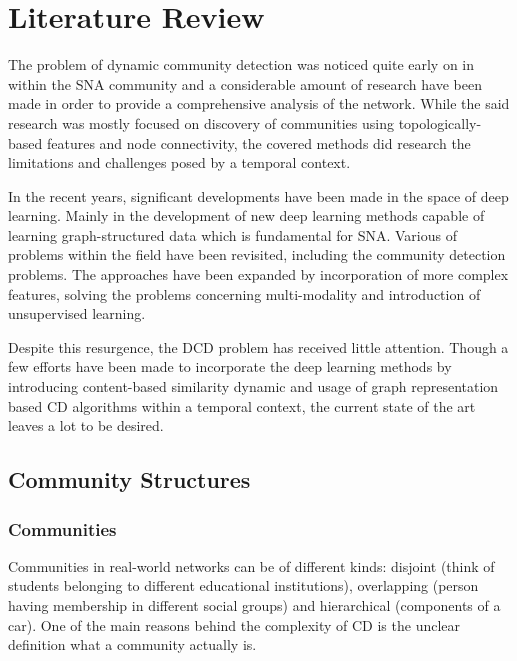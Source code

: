 \documentclass[
acmsmall,
nonacm,
screen,
acmthm]{../../scripts/pandoc/templates/acmart}
\begin{document}
\hypertarget{literature-review}{%
\section{Literature Review}\label{literature-review}}

The problem of dynamic community detection was noticed quite early on in
within the SNA community and a considerable amount of research have been
made in order to provide a comprehensive analysis of the network. While
the said research was mostly focused on discovery of communities using
topologically-based features and node connectivity, the covered methods
did research the limitations and challenges posed by a temporal context.

In the recent years, significant developments have been made in the
space of deep learning. Mainly in the development of new deep learning
methods capable of learning graph-structured data
\citep{bronsteinGeometricDeepLearning2017, hamiltonRepresentationLearningGraphs2018, kipfSemiSupervisedClassificationGraph2017}
which is fundamental for SNA. Various of problems within the field have
been revisited, including the community detection problems. The
approaches have been expanded by incorporation of more complex features,
solving the problems concerning multi-modality and introduction of
unsupervised learning.

Despite this resurgence, the DCD problem has received little attention.
Though a few efforts have been made to incorporate the deep learning
methods by introducing content-based similarity dynamic and usage of
graph representation based CD algorithms within a temporal context, the
current state of the art leaves a lot to be desired.

\hypertarget{community-structures}{%
\subsection{Community Structures}\label{community-structures}}

\hypertarget{communities}{%
\subsubsection{Communities}\label{communities}}

Communities in real-world networks can be of different kinds: disjoint
(think of students belonging to different educational institutions),
overlapping (person having membership in different social groups) and
hierarchical (components of a car). One of the main reasons behind the
complexity of CD is the unclear definition what a community actually is.
\end{document}
